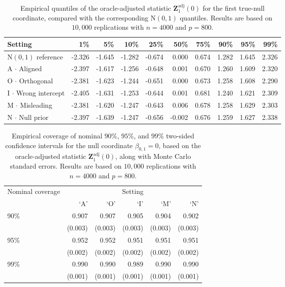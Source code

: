 \documentclass{article}
\theoremstyle{definition}
\newcommand*{\bb}{\boldsymbol}
\begin{document}
\begin{bibunit}
\begin{table}[H]
\centering
\begin{tabular}{@{}lrrrrrrrrr@{}}
\toprule
Setting & 1\% & 5\% & 10\% & 25\% & 50\% & 75\% & 90\% & 95\% & 99\% \\
\midrule
$\mathrm{N}(0,1)$ reference& -2.326 & -1.645 & -1.282 & -0.674 & 0.000 & 0.674 & 1.282 & 1.645 & 2.326 \\
$\mathrm{A}$  $\cdot$ Aligned & -2.397 & -1.617 & -1.256 & -0.648 & 0.001 & 0.670 & 1.260 & 1.609 & 2.320 \\
$\mathrm{O}$ $\cdot$ Orthogonal & -2.381 & -1.623 & -1.244 & -0.651 & 0.000 & 0.673 & 1.258 & 1.608 & 2.290 \\
$\mathrm{I}$ $\cdot$ Wrong intercept & -2.405 & -1.631 & -1.253 & -0.644 & 0.001 & 0.681 & 1.240 & 1.621 & 2.309 \\
$\mathrm{M}$ $\cdot$ Misleading & -2.381 & -1.620 & -1.247 & -0.643 & 0.006 & 0.678 & 1.258 & 1.629 & 2.303 \\
$\mathrm{N}$ $\cdot$ Null prior & -2.397 & -1.639 & -1.247 & -0.656 & -0.002 & 0.676 & 1.259 & 1.627 & 2.338 \\
\bottomrule
\end{tabular}
\caption{Empirical quantiles of the oracle-adjusted statistic
$\bb Z_{1}^{\mathrm{adj}}(0)$ for the first true-null coordinate,
compared with the corresponding $\mathrm N(0,1)$ quantiles.
Results are based on $10{,}000$ replications with $n=4000$ and $p=800$.}
\label{tab:inference-adjusted-z-quantiles}
\end{table}

\begin{table}[H]
\centering
\begin{tabular}{@{}lrrrrr@{}}
\toprule
Nominal coverage & \multicolumn{5}{c}{Setting} \\
\cmidrule(l){2-6}
 & `$\mathrm{A}$' & `$\mathrm{O}$' & `$\mathrm{I}$' & `$\mathrm{M}$' & `$\mathrm{N}$' \\
\midrule
90\% & 0.907 & 0.907 & 0.905 & 0.904 & 0.902 \\[-2pt]
 & (0.003) & (0.003) & (0.003) & (0.003) & (0.003) \\
95\% & 0.952 & 0.952 & 0.951 & 0.951 & 0.951 \\[-2pt]
 & (0.002) & (0.002) & (0.002) & (0.002) & (0.002) \\
99\% & 0.990 & 0.990 & 0.989 & 0.990 & 0.990 \\[-2pt]
 & (0.001) & (0.001) & (0.001) & (0.001) & (0.001) \\
\bottomrule
\end{tabular}
\caption{Empirical coverage of nominal $90\%$, $95\%$, and $99\%$
two-sided confidence intervals for the null coordinate
$\beta_{0,1}=0$, based on the oracle-adjusted statistic
$\bb Z_{1}^{\mathrm{adj}}(0)$, along with Monte Carlo standard errors.
Results are based on $10{,}000$ replications with $n=4000$ and $p=800$.}
\label{tab:inference-adjusted-z-coverage}
\end{table}



\end{bibunit}
\end{document}
